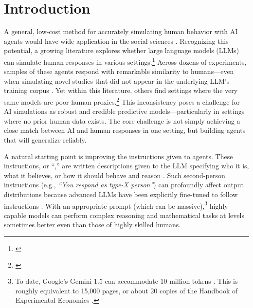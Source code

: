 \section{Introduction} 
\label{sec:introduction}

A general, low-cost method for accurately simulating human behavior with AI agents would have wide application in the social sciences \citep{Charness2025NextGen,jackson2025ai,promising2025LLM}.
Recognizing this potential, a growing literature explores whether large language models (LLMs) can simulate human responses in various settings.\footnote{\citep{argyle2022out,aher2022using,binz2023cognitive,brand2023using,park2023generative,
jackson2024turing,1000agents2024park,chang2024networks,Manning2024Automated,
capra2024llms,hansen2024simulating,kim2024homoeconomicus,
wang2025market,Duch2025Possum,zhu2025evidence,Broska2025Mixed,
bybee2025ghost,fish2025collusion}}
Across dozens of experiments, samples of these agents respond with remarkable similarity to humans---even when simulating novel studies that did not appear in the underlying LLM's training corpus \citep{hewitt2024predictingLLM,binz2025centaur,ValidityLLM2024,Tranchero2024LLMtheorizing,suh2025finetuningscaled}.
Yet within this literature, others find settings where the very same models are poor human proxies.\footnote{\citep{opinions2023Santukar,WhichHumans:2023,Cheng2023caricature,Gui2023Causal,gao2024caution}}
This inconsistency poses a challenge for AI simulations as robust and credible predictive models---particularly in settings where no prior human data exists.
The core challenge is not simply achieving a close match between AI and human responses in one setting, but building agents that will generalize reliably.

A natural starting point is improving the instructions given to agents.
These instructions, or ``,'' are written descriptions given to the LLM specifying who it is, what it believes, or how it should behave and reason \citep{horton2023large}.
Such second-person instructions (e.g., \emph{``You respond as type-X person''}) can profoundly affect output distributions because advanced LLMs have been explicitly fine-tuned to follow instructions \citep{bai2022helpfulharmless,ouyang2022training}.
With an appropriate prompt (which can be massive),\footnote{To date, Google's Gemini 1.5 can accommodate 10 million tokens \citep{Gemini152024}. 
This is roughly equivalent to 15{,}000 pages, or about 20 copies of the Handbook of Experimental Economics \citep{Kagel1995Handbook}.} highly capable models can perform complex reasoning and mathematical tasks at levels sometimes better even than those of highly skilled humans.

